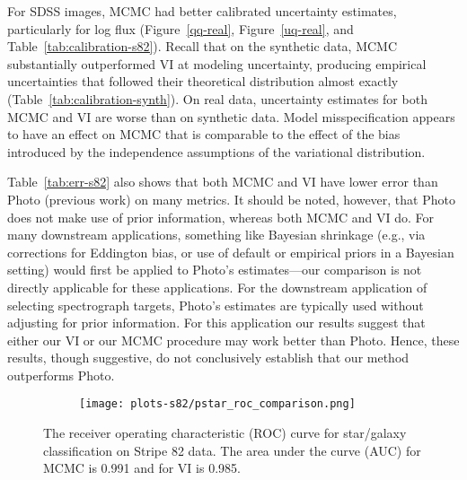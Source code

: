 For SDSS images, MCMC had better calibrated uncertainty estimates, particularly for log flux (Figure~\ref{qq-real}, Figure~\ref{uq-real}, and Table~\ref{tab:calibration-s82}).
Recall that on the synthetic data, MCMC substantially outperformed VI at modeling uncertainty, producing empirical uncertainties that followed their theoretical distribution almost exactly (Table~\ref{tab:calibration-synth}).
On real data, uncertainty estimates for both MCMC and VI are worse than on synthetic data.
Model misspecification appears to have an effect on MCMC that is comparable to the effect of the bias introduced by the independence assumptions of the variational distribution.

Table~\ref{tab:err-s82} also shows that both MCMC and VI have lower error than Photo (previous work) on many metrics. It should be noted, however, that Photo does not make use of prior information, whereas both MCMC and VI do. For many downstream applications, something like Bayesian shrinkage (e.g., via corrections for Eddington bias, or use of default or empirical priors in a Bayesian setting) would first be applied to Photo's estimates---our comparison is not directly applicable for these applications. For the downstream application of selecting spectrograph targets, Photo's estimates are typically used without adjusting for prior information. For this application our results suggest that either our VI or our MCMC procedure may work better than Photo.
Hence, these results, though suggestive, do not conclusively establish that our method outperforms Photo.


\begin{figure}
  \centering
  \begin{subfigure}{.45\textwidth}
    \centering
    \texttt{[image: plots-s82/pstar\_roc\_comparison.png]}
  \end{subfigure}
  \caption{The receiver operating characteristic (ROC) curve for star/galaxy classification on Stripe 82 data. The area under the curve (AUC) for MCMC is 0.991 and for VI is 0.985.
  }
\label{roc-real}
\end{figure}

\begin{table}
  \centering
  \scalebox{.85}{
  
  }
  \vspace{0.5em}
  \caption{%
\textit{Left columns:} Mean absolute error on Stripe 82 data.
\textit{Right columns:}~Pairwise error differences for each pair of methods (and standard error).
Statistically significant differences appear in bold font.}
\label{tab:err-s82}
\end{table}

